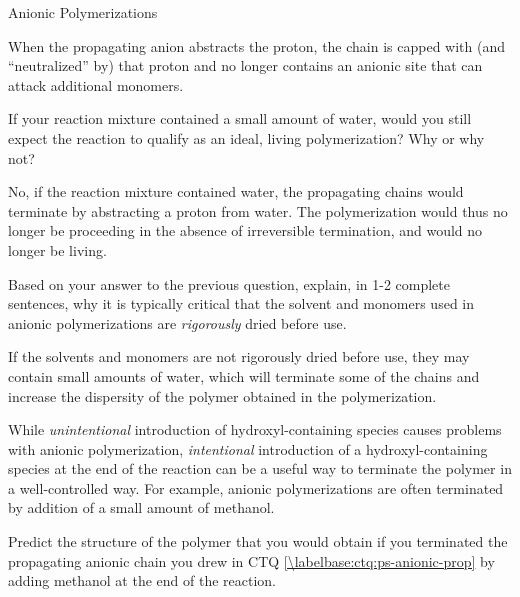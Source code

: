\begin{activity}{Anionic Polymerizations}
\begin{ctqs}
		\begin{solution}[1.25in]{}
			When the propagating anion abstracts the proton, the chain is capped with (and ``neutralized'' by) that proton and no longer contains an anionic site that can attack additional monomers.
		\end{solution}
	
	\question If your reaction mixture contained a small amount of water, would you still expect the reaction to qualify as an ideal, living polymerization?  Why or why not?
	
		\begin{solution}[1.25in]{}
			No, if the reaction mixture contained water, the propagating chains would terminate by abstracting a proton from water.  The polymerization would thus no longer be proceeding in the absence of irreversible termination, and would no longer be living.
		\end{solution}
	
	\question Based on your answer to the previous question, explain, in 1-2 complete sentences, why it is typically critical that the solvent and monomers used in anionic polymerizations are \emph{rigorously} dried before use.
	
		\begin{solution}[1.25in]{}
			If the solvents and monomers are not rigorously dried before use, they may contain small amounts of water, which will terminate some of the chains and increase the dispersity of the polymer obtained in the polymerization.
		\end{solution}
	
\end{ctqs}

\begin{infobox}

	While \emph{unintentional} introduction of hydroxyl-containing species causes problems with anionic polymerization, \emph{intentional} introduction of a hydroxyl-containing species at the end of the reaction can be a useful way to terminate the polymer in a well-controlled way.  For example, anionic polymerizations are often terminated by addition of a small amount of methanol.

\end{infobox}

\begin{ctqs}

	\question Predict the structure of the polymer that you would obtain if you terminated the propagating anionic chain you drew in CTQ \ref{\labelbase:ctq:ps-anionic-prop} by adding methanol at the end of the reaction.
	

\end{ctqs}
\end{activity}
